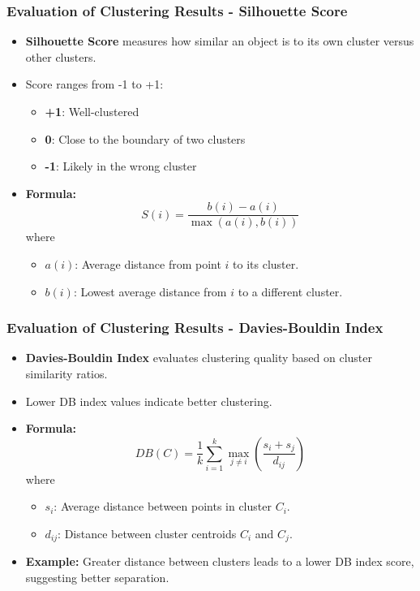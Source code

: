 \documentclass[aspectratio=169]{beamer}
\begin{document}
\begin{frame}[fragile]
    \frametitle{Evaluation of Clustering Results - Silhouette Score}
    \begin{itemize}
        \item \textbf{Silhouette Score} measures how similar an object is to its own cluster versus other clusters.
        \item Score ranges from -1 to +1:
            \begin{itemize}
                \item \textbf{+1}: Well-clustered
                \item \textbf{0}: Close to the boundary of two clusters
                \item \textbf{-1}: Likely in the wrong cluster
            \end{itemize}
        \item \textbf{Formula:}
        \begin{equation}
        S(i) = \frac{b(i) - a(i)}{\max(a(i), b(i))}
        \end{equation}
        where 
        \begin{itemize}
            \item \( a(i) \): Average distance from point \( i \) to its cluster.
            \item \( b(i) \): Lowest average distance from \( i \) to a different cluster.
        \end{itemize}    
    \end{itemize}
\end{frame}

\begin{frame}[fragile]
    \frametitle{Evaluation of Clustering Results - Davies-Bouldin Index}
    \begin{itemize}
        \item \textbf{Davies-Bouldin Index} evaluates clustering quality based on cluster similarity ratios.
        \item Lower DB index values indicate better clustering.
        \item \textbf{Formula:}
        \begin{equation}
        DB(C) = \frac{1}{k} \sum_{i=1}^{k} \max_{j \neq i} \left( \frac{s_i + s_j}{d_{ij}} \right)
        \end{equation}
        where
        \begin{itemize}
            \item \( s_i \): Average distance between points in cluster \( C_i \).
            \item \( d_{ij} \): Distance between cluster centroids \( C_i \) and \( C_j \).
        \end{itemize}  
        \item \textbf{Example:} Greater distance between clusters leads to a lower DB index score, suggesting better separation.
    \end{itemize}
\end{frame}
\end{document}
